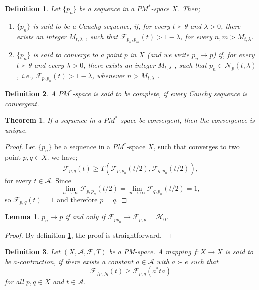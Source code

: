 \documentclass{amsart}%
\newtheorem{theorem}{Theorem}
\theoremstyle{plain}
\newtheorem{definition}{Definition}
\newtheorem{lemma}{Lemma}
\numberwithin{equation}{section}
\begin{document}
\begin{definition}\label{def-conv}
	Let $\{p_n \}$ be a sequence in a $PM^*$-space $X$. Then;
	\begin{enumerate}
		\item $\{p_n \}$ is said to be a Cauchy sequence, if, for every $t\succ \theta$ and  $\lambda > 0$, there exists an integer $M_{t, \lambda}$ , such that $\mathcal{F}_{p_n,p_m}(t) > 1-\lambda$, for every $n,m> M_{t, \lambda}$.\\
		\item $\{p_n \}$ is said to converge to a point $p$ in $X$ (and we write $p_n \to p$) if, for every $t\succ \theta$ and every $\lambda > 0$, there exists an integer $M_{t, \lambda}$ , such that $p_n \in \mathcal{N}_p (t, \lambda)$, i.e., $\mathcal{F}_{p,p_n}(t) > 1-\lambda$, whenever $n > M_{t, \lambda}$ .
	\end{enumerate} 
\end{definition}
\begin{definition}
	A $PM^*$-space is said to be {\em complete}, if every Cauchy sequence is convergent.
\end{definition}

\begin{theorem}
	If a sequence in a $PM^*$-space be convergent, then the convergence is unique.
\end{theorem}
\begin{proof}
	Let $\{p_n\}$ be a sequence in a $PM^*$-space $X$, such that converges to two point $p, q \in X$. we have;
	$$\mathcal{F}_{p,q}(t)\geq T\left(\mathcal{F}_{p,p_n}(t/2
	),\mathcal{F}_{q,p_n}(t/2) \right),$$
	for every $t\in \mathcal{A}$. Since
	$$\lim_{n\to \infty}\mathcal{F}_{p,p_n}(t/2
	)=\lim_{n\to \infty}\mathcal{F}_{q,p_n}(t/2
	)=1,$$ so $\mathcal{F}_{p,q}(t)=1$ and therefore $p=q$.
\end{proof}

\begin{lemma}
	$p_n\to p$ if and only if $\mathcal{F}_{pp_n} \to \mathcal{F}_{p,p} = \mathcal{H}_0$.
\end{lemma}

\begin{proof}
	By definition \ref{def-conv}, the proof is straightforward.  
\end{proof}



\begin{definition}
	Let  $(X,\mathcal{A},\mathcal{F},T)$ be a PM-space. A mapping $f:X\to X$ is said to be $a$-contraction, if there exists a constant $a\in \mathcal{A}$ with $a\succ e$ such that
	$$\mathcal{F}_{fp,fq}(t)\geq \mathcal{F}_{p,q}(a^*ta)$$
	for all $p, q \in X$ and $t\in \mathcal{A}$.
\end{definition}
\end{document}
